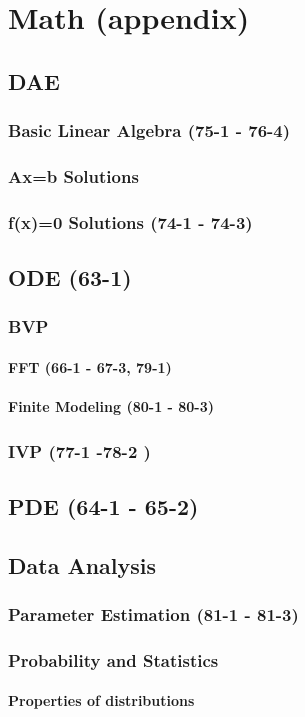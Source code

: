 \documentclass{mitqualif}
\begin{document}
\chapter{Math (appendix)}
\section{DAE}
\subsection{Basic Linear Algebra (75-1 - 76-4)}
\subsection{Ax=b Solutions}
\subsection{f(x)=0 Solutions (74-1 - 74-3)}
\section{ODE (63-1)}
\subsection{BVP}
\subsubsection{FFT (66-1 - 67-3, 79-1)}
\subsubsection{Finite Modeling (80-1 - 80-3)}
\subsection{IVP (77-1 -78-2 )}
\section{PDE (64-1 - 65-2)}
\section{Data Analysis}
\subsection{Parameter Estimation (81-1 - 81-3)}
\subsection{Probability and Statistics}
\subsubsection{Properties of distributions}
 


\newpage

\newpage
\printindex
\newpage

\end{document}
